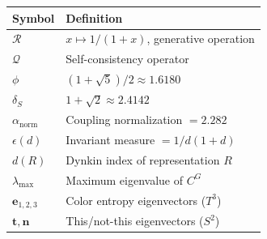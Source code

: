 \documentclass[11pt]{article}
\begin{document}
\begin{tabular}{@{}ll@{}}
\toprule
Symbol & Definition \\
\midrule
$\mathcal{R}$        & $x\mapsto1/(1+x)$, generative operation \\
$\mathcal{Q}$        & Self-consistency operator \\
$\phi$               & $(1+\sqrt{5})/2\approx1.6180$ \\
$\delta_S$           & $1+\sqrt{2}\approx2.4142$ \\
$\alpha_\text{norm}$ & Coupling normalization $=2.282$ \\
$\epsilon(d)$        & Invariant measure $=1/d(1+d)$ \\
$d(R)$               & Dynkin index of representation $R$ \\
$\lambda_\text{max}$ & Maximum eigenvalue of $C^G$ \\
$\mathbf{e}_{1,2,3}$ & Color entropy eigenvectors ($T^3$) \\
$\mathbf{t},\mathbf{n}$ & This/not-this eigenvectors ($S^2$) \\
\bottomrule
\end{tabular}
\end{document}
